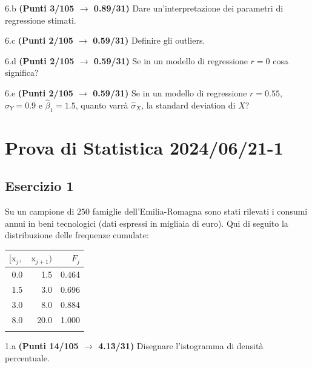 \documentclass[
  11pt,
]{book}
\theoremstyle{mytheoremstyle}
\theoremstyle{mydefstyle}
\begin{document}
6.b \textbf{(Punti 3/105 \(\rightarrow\) 0.89/31)} Dare un'interpretazione dei parametri di regressione stimati.

6.c \textbf{(Punti 2/105 \(\rightarrow\) 0.59/31)} Definire gli outliers.

6.d \textbf{(Punti 2/105 \(\rightarrow\) 0.59/31)} Se in un modello di regressione \(r=0\) cosa significa?

6.e \textbf{(Punti 2/105 \(\rightarrow\) 0.59/31)} Se in un modello di regressione \(r=0.55\), \(\hat\sigma_Y=0.9\) e \(\hat\beta_1=1.5\), quanto varrà
\(\hat\sigma_X\), la standard deviation di \(X\)?

\section{Prova di Statistica 2024/06/21-1}\label{prova-di-statistica-20240621-1}

\subsection{Esercizio 1}\label{esercizio-1-38}

Su un campione di \(250\) famiglie dell'Emilia-Romagna sono stati rilevati i consumi annui in beni tecnologici (dati espressi in migliaia di euro). Qui di seguito la distribuzione delle frequenze cumulate:

\begin{table}[H]
\centering
\begin{tabular}{rrr}
\toprule
$[\text{x}_j,$ & $\text{x}_{j+1})$ & $F_j$\\
\midrule
0.0 & 1.5 & 0.464\\
1.5 & 3.0 & 0.696\\
3.0 & 8.0 & 0.884\\
8.0 & 20.0 & 1.000\\
 &  & \\
\bottomrule
\end{tabular}
\end{table}

1.a \textbf{(Punti 14/105 \(\rightarrow\) 4.13/31)} Disegnare l'istogramma di densità percentuale.
\end{document}
